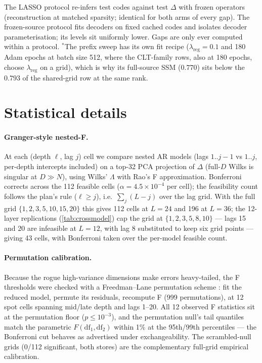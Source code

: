 The LASSO protocol re-infers test codes against test $\Delta$ with frozen
operators (reconstruction at matched sparsity; identical for both arms of
every gap). The frozen-source protocol fits decoders on fixed cached codes
and isolates decoder parameterisation; its levels sit uniformly lower. Gaps
are only ever computed within a protocol. $^{\ast}$The prefix sweep has its
own fit recipe ($\lambda_{\mathrm{reg}} = 0.1$ and 180 Adam epochs at
batch size 512, where the CLT-family rows, also at 180 epochs, choose
$\lambda_{\mathrm{reg}}$ on a grid), which is why its full-source SSM
($0.770$) sits below the $0.793$ of the shared-grid row at the same rank.

\section{Statistical details}
\label{app:stats}

\paragraph{Granger-style nested-F.}
At each (depth $\ell$, lag $j$) cell we compare nested AR models (lags
$1..j{-}1$ vs $1..j$, per-depth intercepts included) on a top-32 PCA
projection of $\Delta$ (full-$D$ Wilks is singular at $D \gg N$), using
Wilks' $\Lambda$ with Rao's F approximation. Bonferroni corrects across the
112 feasible cells ($\alpha = 4.5\times10^{-4}$ per cell); the feasibility
count follows the plan's rule ($\ell \ge j$), i.e.\ $\sum_j (L - j)$ over the
lag grid. With the full grid $\{1,2,3,5,10,15,20\}$ this gives 112 cells at
$L{=}24$ and 196 at $L{=}36$; the 12-layer replications
(\cref{tab:crossmodel}) cap the grid at $\{1,2,3,5,8,10\}$ --- lags 15 and
20 are infeasible at $L{=}12$, with lag 8 substituted to keep six grid
points --- giving 43 cells, with Bonferroni taken
over the per-model feasible count.

\paragraph{Permutation calibration.}
Because the rogue high-variance dimensions make errors heavy-tailed, the F
thresholds were checked with a Freedman--Lane permutation scheme
\citep{freedman1983nonstochastic}: fit the reduced model, permute its
residuals, recompute F (999 permutations), at 12 spot cells spanning mid/late
depth and lags 1--20. All 12 observed F statistics sit at the permutation
floor ($p \le 10^{-3}$), and the permutation null's tail quantiles match the
parametric $F(\mathrm{df}_1,\mathrm{df}_2)$ within 1\% at the 95th/99th
percentiles --- the Bonferroni cut behaves as advertised under
exchangeability. The scrambled-null grids (0/112 significant, both stores)
are the complementary full-grid empirical calibration.

